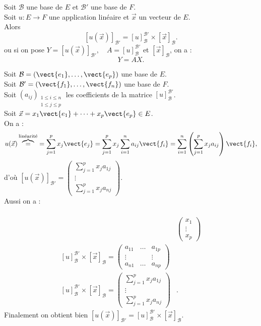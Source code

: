 \documentclass{book}
\begin{document}
\begin{Theoreme}
Soit $\mathcal{B}$ une base de $E$ et $\mathcal{B}'$ une base de $F$.\\
Soit $u:E\to F$ une application linéaire et $\vec{x}$ un vecteur de $E$.\\
Alors \[ [u(\vec{x})]_{\mathcal{B}'} = [u]_\mathcal{B}^{\mathcal{B}'} × [\vec{x}]_\mathcal{B}. \]
ou si on pose $Y=[u(\vec{x})]_{\mathcal{B}'},\quad A =[u]_\mathcal{B}^{\mathcal{B}'}$ et  $[\vec{x}]_\mathcal{B}$, on a :
$$Y=AX.$$
\end{Theoreme}
\begin{Demonstration}
Soit $\mathcal{B}=(\vect{e_1},\dots,\vect{e_p})$ une base de $E$.\\
Soit $\mathcal{B}'=(\vect{f_1},\dots,\vect{f_n})$ une base de $F$.\\
Soit $(a_{ij})_{\substack{1\leq i\leq n\\1\leq j\leq p}}$ les coefficients de la matrice $[u]_\mathcal{B}^{\mathcal{B}'}$.\\
Soit $\vec{x}=x_1\vect{e_1}+\dots+x_p\vect{e_p}\in E$.\\
On a :
$$u(\vec{x})\overbrace{=}^{\text{linéarité}} =\sum_{j=1}^p x_j\vect{e_j}=\sum_{j=1}^p x_j\sum_{i=1}^n a_{ij} \vect{f_i}=\sum_{i=1}^n \left(\sum_{j=1}^p x_j a_{ij}\right) \vect{f_i}, $$
d'où $ [u(\vec{x})]_{\mathcal{B}'}=\begin{pmatrix}\sum_{j=1}^p x_j a_{1j} \\\vdots\\\sum_{j=1}^p x_j a_{nj} \end{pmatrix}$.\\
Aussi on a :

$$\begin{aligned}\\
 &\begin{pmatrix}x_1\\\vdots\\x_p\end{pmatrix} \\
\left[u\right]_{\mathcal{B}}^{\mathcal{B}'} \times \left[\vec{x}\right]_{\mathcal{B}}=\begin{pmatrix}
    a_{11} &  \dots & a_{1p}  \\
    \vdots &   &  \vdots  \\
    a_{n1} &  \dots & a_{np}
  \end{pmatrix}& \\
\left[u\right]_{\mathcal{B}}^{\mathcal{B}'} \times \left[\vec{x}\right]_{\mathcal{B}}=\begin{pmatrix}\sum_{j=1}^p x_j a_{1j} \\\vdots\\\sum_{j=1}^p x_j a_{nj} \end{pmatrix}&.
\end{aligned}$$
Finalement on obtient bien $ [u(\vec{x})]_{\mathcal{B}'} = [u]_\mathcal{B}^{\mathcal{B}'} × [\vec{x}]_\mathcal{B}. $
\end{Demonstration}
\end{document}
